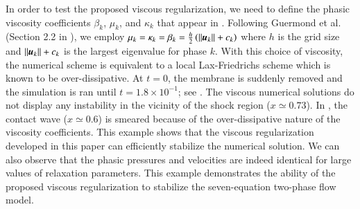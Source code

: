 In order to test the proposed viscous regularization, we need to define the phasic viscosity coefficients $\beta_k$, $\mu_k$, and $\kappa_k$ that appear in . 
Following Guermond et al. (Section 2.2 in \cite{jlg}), we employ $\mu_k =  \kappa_k = \beta_k = \tfrac{h}{2} \left( ||\boldsymbol u_k|| + c_k \right)$ where $h$ is the grid size and $||\boldsymbol u_k|| + c_k$ is the 
largest eigenvalue for phase $k$. With this choice of viscosity, the numerical scheme is equivalent to a local Lax-Friedrichs scheme which is known to be over-dissipative.
At $t=0$, the membrane is suddenly removed and the simulation is ran until $t=1.8\times 10^{-1}$; see .
The viscous numerical solutions do not display any instability in the vicinity of the shock region ($x \simeq 0.73$). In , the contact wave ($x \simeq 0.6$) is smeared 
because of the over-dissipative nature of the viscosity coefficients. This example shows that the viscous regularization developed in this paper can efficiently stabilize the numerical solution.
We can also observe that the phasic pressures and velocities are indeed identical for large values of relaxation parameters.
This example demonstrates the ability of the proposed viscous regularization to stabilize the seven-equation two-phase flow model.
%

